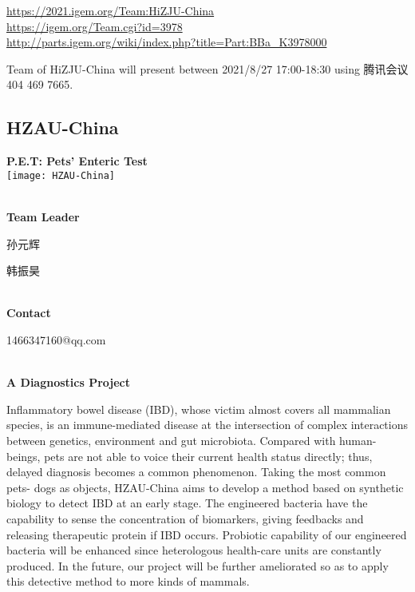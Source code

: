 \url{https://2021.igem.org/Team:HiZJU-China }\\
\url{https://igem.org/Team.cgi?id=3978 }\\
\url{http://parts.igem.org/wiki/index.php?title=Part:BBa_K3978000 }\\


\vfill{}









Team of HiZJU-China will present between   2021/8/27 17:00-18:30      using 腾讯会议 404 469 7665.
\newpage


\subsection{\textcolor{Blu}{ HZAU-China } }
\vspace{5mm}
\begin{center}
\large{
  \textbf{ P.E.T: Pets' Enteric Test }\\

  \texttt{[image: HZAU-China]}
}
\end{center}
\textbf{\\Team Leader}

  孙元辉

  韩振昊


\textbf{\\Contact}

  1466347160@qq.com


\textbf{\\A Diagnostics Project\\}\begin{spacing}{1.5}

Inflammatory bowel disease (IBD), whose victim almost covers all mammalian species, is an immune-mediated disease at the intersection of complex interactions between genetics, environment and gut microbiota. Compared with human-beings, pets are not able to voice their current health status directly; thus, delayed diagnosis becomes a common phenomenon. Taking the most common pets- dogs as objects, HZAU-China aims to develop a method based on synthetic biology to detect IBD at an early stage. The engineered bacteria have the capability to sense the concentration of biomarkers, giving feedbacks and releasing therapeutic protein if IBD occurs. Probiotic capability of our engineered bacteria will be enhanced since heterologous health-care units are constantly produced. In the future, our project will be further ameliorated so as to apply this detective method to more kinds of mammals.\end{spacing}
\\

